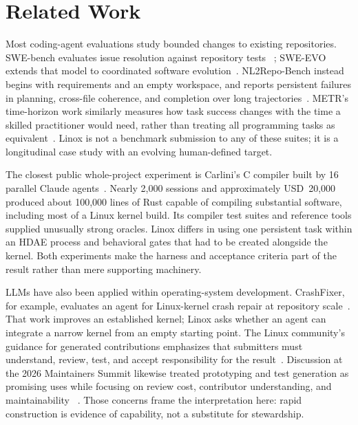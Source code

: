 \documentclass[11pt]{article}
\begin{document}
\section{Related Work}

Most coding-agent evaluations study bounded changes to existing repositories.
SWE-bench evaluates issue resolution against repository tests
~\cite{jimenez2023swebench}; SWE-EVO extends that model to coordinated software
evolution~\cite{thai2025sweevo}. NL2Repo-Bench instead begins with requirements
and an empty workspace, and reports persistent failures in planning, cross-file
coherence, and completion over long trajectories~\cite{ding2026nl2repo}. METR's
time-horizon work similarly measures how task success changes with the time a
skilled practitioner would need, rather than treating all programming tasks as
equivalent~\cite{kwa2025timehorizon}. Linox is not a benchmark submission to any
of these suites; it is a longitudinal case study with an evolving human-defined
target.

The closest public whole-project experiment is Carlini's C compiler built by 16
parallel Claude agents~\cite{carlini2026compiler}. Nearly 2,000 sessions and
approximately USD~20,000 produced about 100,000 lines of Rust capable of
compiling substantial software, including most of a Linux kernel build. Its
compiler test suites and reference tools supplied unusually strong oracles.
Linox differs in using one persistent task within an HDAE process and
behavioral gates that had to be created alongside the kernel. Both experiments
make the harness and acceptance criteria part of the result rather than mere
supporting machinery.

LLMs have also been applied within operating-system development. CrashFixer,
for example, evaluates an agent for Linux-kernel crash repair at repository
scale~\cite{mathai2025crashfixer}. That work improves an established kernel;
Linox asks whether an agent can integrate a narrow kernel from an empty starting
point. The Linux community's guidance for generated contributions emphasizes
that submitters must understand, review, test, and accept responsibility for the
result~\cite{linuxGeneratedContent}. Discussion at the 2026 Maintainers Summit
likewise treated prototyping and test generation as promising uses while
focusing on review cost, contributor understanding, and maintainability
~\cite{corbet2026summit}. Those concerns frame the interpretation here: rapid
construction is evidence of capability, not a substitute for stewardship.
\end{document}
